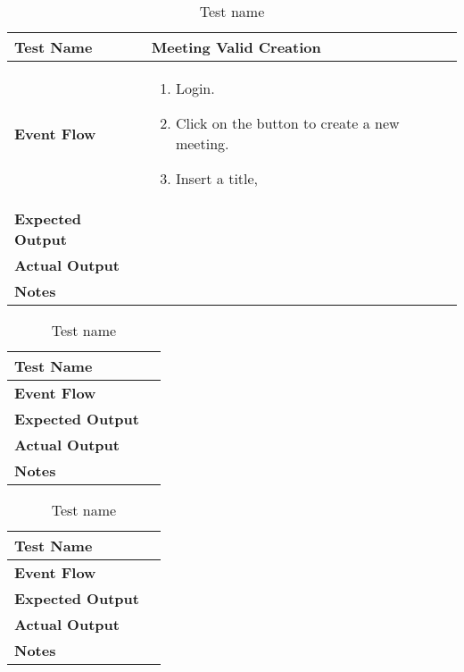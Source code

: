 \begin{table}[h]	
\centering
\def\arraystretch{1.5}
\begin{tabular}{|m{7cm}|m{7cm}|}
	\hline
	\textbf{Test Name}            & Meeting Valid Creation   \\ \hline
	\textbf{Event Flow}             & 
	 	\begin{enumerate}
	 	\item Login.
	 	\item Click on the button to create a new meeting.
	 	\item Insert a title, 
	 \end{enumerate} \\ \hline
	\textbf{Expected Output}  &     \\ \hline
	\textbf{Actual Output}       &     \\ \hline
	\textbf{Notes} & \\ \hline
\end{tabular}
\caption{Test name}
\end{table}


\begin{table}[h]	
\centering
\def\arraystretch{1.5}
\begin{tabular}{|m{7cm}|m{7cm}|}
	\hline
	\textbf{Test Name}            &    \\ \hline
	\textbf{Event Flow}             &   \\ \hline
	\textbf{Expected Output}  &     \\ \hline
	\textbf{Actual Output}       &     \\ \hline
	\textbf{Notes} & \\ \hline
\end{tabular}
\caption{Test name}
\end{table}


\begin{table}[h]	
\centering
\def\arraystretch{1.5}
\begin{tabular}{|m{7cm}|m{7cm}|}
	\hline
	\textbf{Test Name}            &    \\ \hline
	\textbf{Event Flow}             &   \\ \hline
	\textbf{Expected Output}  &     \\ \hline
	\textbf{Actual Output}       &     \\ \hline
	\textbf{Notes} & \\ \hline
\end{tabular}
\caption{Test name}
\end{table}



